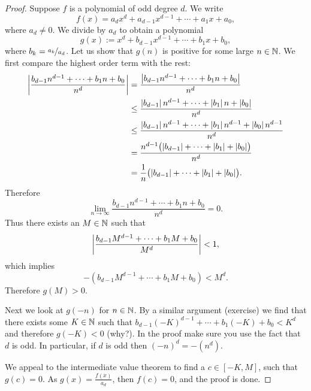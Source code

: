 \begin{proof}
Suppose $f$ is a polynomial of odd degree $d$.  We write
\begin{equation*}
f(x) = a_d x^d + a_{d-1} x^{d-1} + \cdots + a_1 x + a_0 ,
\end{equation*}
where $a_d \not= 0$.  We divide by $a_d$ to obtain a polynomial
\begin{equation*}
g(x) := x^d + b_{d-1} x^{d-1} + \cdots + b_1 x + b_0 ,
\end{equation*}
where $b_k = \nicefrac{a_k}{a_d}$.
Let us show that $g(n)$ is
positive for some large $n \in {\mathbb{N}}$.
We first compare the highest order term with the rest:
\begin{equation*}
\begin{split}
\left\lvert {\frac{b_{d-1} n^{d-1} + \cdots + b_1 n + b_0}{n^d}} \right\rvert
& =
\frac{\left\lvert {b_{d-1} n^{d-1} + \cdots + b_1 n + b_0} \right\rvert}{n^d}
\\
& \leq
\frac{\left\lvert {b_{d-1}} \right\rvert n^{d-1} + \cdots + \left\lvert {b_1} \right\rvert n + \left\lvert {b_0} \right\rvert}{n^d}
\\
& \leq
\frac{\left\lvert {b_{d-1}} \right\rvert n^{d-1} + \cdots + \left\lvert {b_1} \right\rvert n^{d-1} + \left\lvert {b_0} \right\rvert n^{d-1}}{n^d}
\\
& =
\frac{n^{d-1}\bigl(\left\lvert {b_{d-1}} \right\rvert + \cdots + \left\lvert {b_1} \right\rvert + \left\lvert {b_0} \right\rvert\bigr)}{n^d}
\\
& =
\frac{1}{n}
\bigl(\left\lvert {b_{d-1}} \right\rvert + \cdots + \left\lvert {b_1} \right\rvert + \left\lvert {b_0} \right\rvert\bigr) .
\end{split}
\end{equation*}
Therefore
\begin{equation*}
\lim_{n\to\infty} \frac{b_{d-1} n^{d-1} + \cdots + b_1 n + b_0}{n^d}
= 0 .
\end{equation*}
Thus there exists an $M \in {\mathbb{N}}$ such that 
\begin{equation*}
\left\lvert {\frac{b_{d-1} M^{d-1} + \cdots + b_1 M + b_0}{M^d}} \right\rvert < 1 ,
\end{equation*}
which implies
\begin{equation*}
-(b_{d-1} M^{d-1} + \cdots + b_1 M + b_0) < M^d .
\end{equation*}
Therefore $g(M) > 0$.

Next we look at $g(-n)$ for $n \in {\mathbb{N}}$.  By a similar argument (exercise)
we find that there exists some $K \in {\mathbb{N}}$ such that
$b_{d-1} {(-K)}^{d-1} + \cdots + b_1 (-K) + b_0 < K^d$
and therefore $g(-K) < 0$ (why?).
In the
proof make sure you use the fact that $d$ is odd.  In particular, 
if $d$ is odd then ${(-n)}^d = -(n^d)$.

We appeal to the intermediate value theorem to find a
$c \in [-K,M]$, such that $g(c) = 0$.  As $g(x) = \frac{f(x)}{a_d}$,
then $f(c) = 0$, and the proof is done.
\end{proof}

